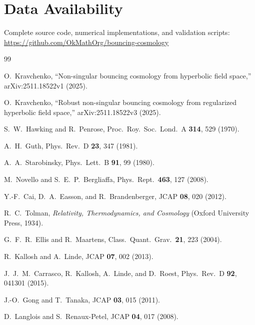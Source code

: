 \documentclass[11pt,a4paper]{article}
\begin{document}
\section*{Data Availability}

Complete source code, numerical implementations, and validation scripts:\\
\url{https://github.com/OkMathOrg/bouncing-cosmology}

\begin{thebibliography}{99}
\sloppy
{}

O.~Kravchenko,
``Non-singular bouncing cosmology from hyperbolic field space,''
arXiv:2511.18522v1 (2025).

O.~Kravchenko,
``Robust non-singular bouncing cosmology from regularized hyperbolic field space,''
arXiv:2511.18522v3 (2025).

S.~W.~Hawking and R.~Penrose,
Proc.\ Roy.\ Soc.\ Lond.\ A \textbf{314}, 529 (1970).

A.~H.~Guth,
Phys.\ Rev.\ D \textbf{23}, 347 (1981).

A.~A.~Starobinsky,
Phys.\ Lett.\ B \textbf{91}, 99 (1980).

M.~Novello and S.~E.~P.~Bergliaffa,
Phys.\ Rept.\ \textbf{463}, 127 (2008).

Y.-F.~Cai, D.~A.~Easson, and R.~Brandenberger,
JCAP \textbf{08}, 020 (2012).

R.~C.~Tolman,
\textit{Relativity, Thermodynamics, and Cosmology}
(Oxford University Press, 1934).

G.~F.~R.~Ellis and R.~Maartens,
Class.\ Quant.\ Grav.\ \textbf{21}, 223 (2004).

R.~Kallosh and A.~Linde,
JCAP \textbf{07}, 002 (2013).

J.~J.~M.~Carrasco, R.~Kallosh, A.~Linde, and D.~Roest,
Phys.\ Rev.\ D \textbf{92}, 041301 (2015).

J.-O.~Gong and T.~Tanaka,
JCAP \textbf{03}, 015 (2011).

D.~Langlois and S.~Renaux-Petel,
JCAP \textbf{04}, 017 (2008).


\end{thebibliography}
\end{document}
